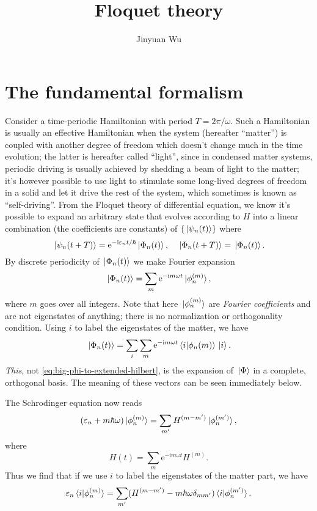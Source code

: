 \documentclass[hyperref, a4paper]{article}
\title{Floquet theory}
\author{Jinyuan Wu}
\newcommand*{\ii}{\mathrm{i}}
\newcommand*{\ee}{\mathrm{e}}
\begin{document}
\maketitle

\section{The fundamental formalism}

Consider a time-periodic Hamiltonian with period $T = 2 \pi / \omega$.
Such a Hamiltonian is usually an effective Hamiltonian
when the system (hereafter ``matter'')
is coupled with another degree of freedom
which doesn't change much in the time evolution;
the latter is hereafter called ``light'',
since in condensed matter systems, 
periodic driving is usually achieved by 
shedding a beam of light to the matter; 
it's however possible to use light to stimulate 
some long-lived degrees of freedom in a solid 
and let it drive the rest of the system, 
which sometimes is known as ``self-driving''.
From the Floquet theory of differential equation, 
we know it's possible to expand an arbitrary state that 
evolves according to $H$ into 
a linear combination (the coefficients are constants) of 
$\{\ket*{\psi_n(t)}\}$ where 
\begin{equation}
    \ket*{\psi_n (t + T)} = \ee^{- \ii \varepsilon_n t / \hbar} \ket*{\Phi_n(t)},
    \quad \ket*{\Phi_n(t + T)} = \ket*{\Phi_n(t)}.
    \label{eq:floquet-wave-function}
\end{equation}
By discrete periodicity of $\ket*{\Phi_n(t)}$ we make Fourier expansion 
\begin{equation}
    \ket*{\Phi_n(t)} = \sum_m \ee^{- \ii m \omega t} \ket*{\phi_n^{(m)}},
    \label{eq:big-phi-to-extended-hilbert}
\end{equation}
where $m$ goes over all integers.
Note that here $\ket*{\phi_n^{(m)}}$
are \emph{Fourier coefficients} and are not eigenstates of anything; 
there is no normalization or orthogonality condition.
Using $i$ to label the eigenstates of the matter, 
we have 
\begin{equation}
    \ket*{\Phi_n(t)} = \sum_{i} \sum_{m}
    \ee^{- \ii m \omega t} \braket*{i}{\phi_n(m)} \ket*{i}.
\end{equation}
\emph{This}, not \eqref{eq:big-phi-to-extended-hilbert}, 
is the expansion of $\ket*{\Phi}$ in a 
complete, orthogonal basis.
The meaning of these vectors can be seen immediately below.

The Schrodinger equation now reads 
\begin{equation}
    (\varepsilon_n + m \hbar \omega) \ket*{\phi_n^{(m)}} 
    = \sum_{m'} H^{(m - m')} \ket*{\phi_n^{(m')}},
\end{equation}
where 
\begin{equation}
    H(t) = \sum_{m} \ee^{- \ii m \omega t} H^{(m)}.
\end{equation}
Thus we find that if we use $i$ to label the eigenstates of the matter part, 
we have 
\begin{equation}
    \varepsilon_n \braket*{i}{\phi^{(m)}_n}
    = \sum_{m'} (
        H^{(m - m')} - m \hbar \omega \delta_{m m'}
    ) \braket*{i}{\phi^{(m')}_{n}}.
    \label{eq:floquet-ham}
\end{equation}
\end{document}
